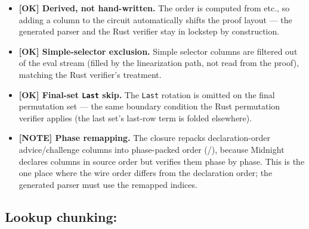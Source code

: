 \begin{itemize}
  \item \textcolor{tracegreen}{\textbf{[OK] Derived, not hand-written.}}
        The order is computed from  etc., so
        adding a column to the circuit automatically shifts the proof
        layout --- the generated parser and the Rust verifier stay in
        lockstep by construction.
  \item \textcolor{tracegreen}{\textbf{[OK] Simple-selector exclusion.}}
        Simple selector columns are filtered out of the eval stream
        (filled by the linearization path, not read from the proof),
        matching the Rust verifier's treatment.
  \item \textcolor{tracegreen}{\textbf{[OK] Final-set \texttt{Last}
        skip.}} The \texttt{Last} rotation is omitted on the final
        permutation set --- the same boundary condition the Rust
        permutation verifier applies (the last set's last-row term is
        folded elsewhere).
  \item \textcolor{mathpurple}{\textbf{[NOTE] Phase remapping.}} The
         closure repacks declaration-order advice/challenge
        columns into phase-packed order (/), because
        Midnight declares columns in source order but verifies them phase
        by phase. This is the one place where the wire order differs from
        the declaration order; the generated parser must use the
        remapped indices.
\end{itemize}

\subsection{Lookup chunking: }
\label{sec:lookup-chunking}


